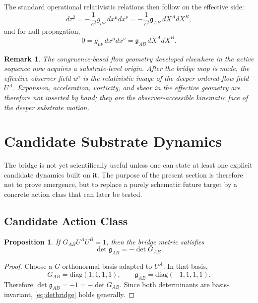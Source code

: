 \documentclass[11pt]{article}
\newcommand{\BridgeMetric}{\mathfrak{g}}
\newtheorem{proposition}{Proposition}
\newtheorem{remark}{Remark}
\begin{document}
The standard operational relativistic relations then follow on the effective side:
\begin{equation}
d\tau^2
=
-\frac{1}{c^2} g_{\mu\nu}\, dx^\mu dx^\nu
=
-\frac{1}{c^2} \BridgeMetric_{AB}\, dX^A dX^B,
\label{eq:bridgepropertime}
\end{equation}
and for null propagation,
\begin{equation}
0
=
g_{\mu\nu}\, dx^\mu dx^\nu
=
\BridgeMetric_{AB}\, dX^A dX^B.
\label{eq:bridgenull}
\end{equation}

\begin{remark}
The congruence-based flow geometry developed elsewhere in the active sequence now acquires a substrate-level origin. After the bridge map is made, the effective observer field \(u^\mu\) is the relativistic image of the deeper ordered-flow field \(U^A\). Expansion, acceleration, vorticity, and shear in the effective geometry are therefore not inserted by hand; they are the observer-accessible kinematic face of the deeper substrate motion.
\end{remark}

\section{Candidate Substrate Dynamics}

The bridge is not yet scientifically useful unless one can state at least one explicit candidate dynamics built on it. The purpose of the present section is therefore not to prove emergence, but to replace a purely schematic future target by a concrete action class that can later be tested.

\subsection{Candidate Action Class}

\begin{proposition}
If \(G_{AB}U^A U^B=1\), then the bridge metric satisfies
\begin{equation}
\det \BridgeMetric_{AB} = - \det G_{AB}.
\label{eq:detbridge}
\end{equation}
\end{proposition}

\begin{proof}
Choose a \(G\)-orthonormal basis adapted to \(U^A\). In that basis,
\[
G_{AB} = \mathrm{diag}(1,1,1,1),
\qquad
\BridgeMetric_{AB} = \mathrm{diag}(-1,1,1,1).
\]
Therefore \(\det \BridgeMetric_{AB} = -1 = -\det G_{AB}\). Since both determinants are basis-invariant, \eqref{eq:detbridge} holds generally.
\end{proof}
\end{document}
